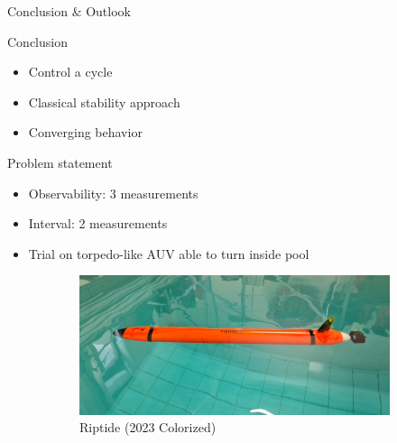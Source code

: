 \documentclass[10pt, xcolor={usenames, dvipsnames}]{beamer}
\begin{document}
        \begin{frame}{Conclusion \& Outlook}
            \centering
            \begin{minipage}[c]{.6\textwidth}
                \begin{block}{Conclusion}
                    \vspace{2.5mm}
                    \begin{itemize}
                        \item Control a cycle
                        \item Classical stability approach
                        \item Converging behavior
                    \end{itemize}
                \end{block}
                \begin{block}{Problem statement}
                    \begin{itemize}
                        \item Observability: 3 measurements
                        \item Interval: 2 measurements
                        \item Trial on torpedo-like AUV able to turn inside pool
                    \end{itemize}
                \end{block}
            \end{minipage}
            \hfill
            \begin{minipage}[c]{.35\textwidth}
                \begin{figure}
                    \begin{subfigure}{\textwidth}
                        \includegraphics[width=\textwidth]{imgs/Riptide}
                        \caption{Riptide (2023 Colorized)}
                    \end{subfigure}
                    \begin{subfigure}{\textwidth}

\end{subfigure}
\end{figure}
\end{minipage}
\end{frame}
\end{document}
